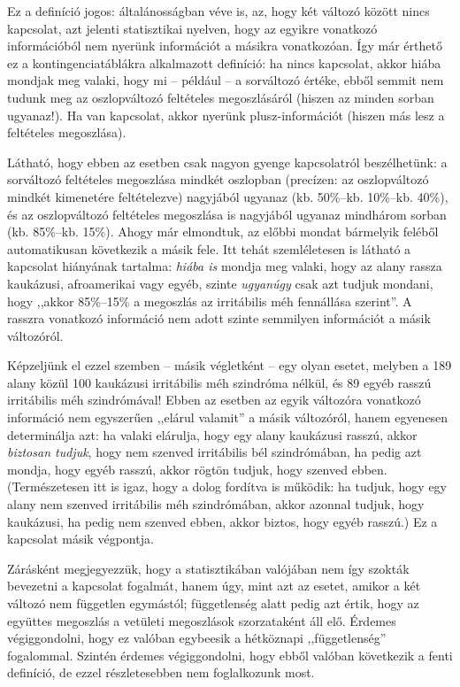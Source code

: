 \documentclass[]{book}
\begin{document}
Ez a definíció jogos: általánosságban véve is, az, hogy két változó
között nincs kapcsolat, azt jelenti statisztikai nyelven, hogy az
egyikre vonatkozó információból nem nyerünk információt a másikra
vonatkozóan. Így már érthető ez a kontingenciatáblákra alkalmazott
definíció: ha nincs kapcsolat, akkor hiába mondjak meg valaki, hogy mi
-- például -- a sorváltozó értéke, ebből semmit nem tudunk meg az
oszlopváltozó feltételes megoszlásáról (hiszen az minden sorban
ugyanaz!). Ha van kapcsolat, akkor nyerünk plusz-információt (hiszen más
lesz a feltételes megoszlása).

Látható, hogy ebben az esetben csak nagyon gyenge kapcsolatról
beszélhetünk: a sorváltozó feltételes megoszlása mindkét oszlopban
(precízen: az oszlopváltozó mindkét kimenetére feltételezve) nagyjából
ugyanaz (kb. 50\%--kb. 10\%--kb. 40\%), és az oszlopváltozó feltételes
megoszlása is nagyjából ugyanaz mindhárom sorban (kb. 85\%--kb. 15\%).
Ahogy már elmondtuk, az előbbi mondat bármelyik feléből automatikusan
következik a másik fele. Itt tehát szemléletesen is látható a kapcsolat
hiányának tartalma: \emph{hiába is} mondja meg valaki, hogy az alany
rassza kaukázusi, afroamerikai vagy egyéb, szinte \emph{ugyanúgy} csak
azt tudjuk mondani, hogy ,,akkor 85\%--15\% a megoszlás az irritábilis
méh fennállása szerint''. A rasszra vonatkozó információ nem adott
szinte semmilyen információt a másik változóról.

Képzeljünk el ezzel szemben -- másik végletként -- egy olyan esetet,
melyben a 189 alany közül 100 kaukázusi irritábilis méh szindróma
nélkül, és 89 egyéb rasszú irritábilis méh szindrómával! Ebben az
esetben az egyik változóra vonatkozó információ nem egyszerűen ,,elárul
valamit'' a másik változóról, hanem egyenesen determinálja azt: ha
valaki elárulja, hogy egy alany kaukázusi rasszú, akkor \emph{biztosan
tudjuk}, hogy nem szenved irritábilis bél szindrómában, ha pedig azt
mondja, hogy egyéb rasszú, akkor rögtön tudjuk, hogy szenved ebben.
(Természetesen itt is igaz, hogy a dolog fordítva is működik: ha tudjuk,
hogy egy alany nem szenved irritábilis méh szindrómában, akkor azonnal
tudjuk, hogy kaukázusi, ha pedig nem szenved ebben, akkor biztos, hogy
egyéb rasszú.) Ez a kapcsolat másik végpontja.

Zárásként megjegyezzük, hogy a statisztikában valójában nem így szokták
bevezetni a kapcsolat fogalmát, hanem úgy, mint azt az esetet, amikor a
két változó nem független egymástól; függetlenség alatt pedig azt értik,
hogy az együttes megoszlás a vetületi megoszlások szorzataként áll elő.
Érdemes végiggondolni, hogy ez valóban egybeesik a hétköznapi
,,függetlenség'' fogalommal. Szintén érdemes végiggondolni, hogy ebből
valóban következik a fenti definíció, de ezzel részletesebben nem
foglalkozunk most.
\end{document}
